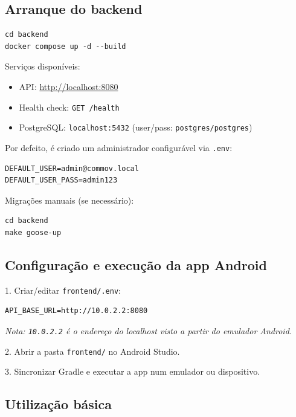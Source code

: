 \documentclass[12pt,a4paper]{article}
\begin{document}
\subsection{Arranque do backend}

\begin{lstlisting}
cd backend
docker compose up -d --build
\end{lstlisting}

Serviços disponíveis:

\begin{itemize}[leftmargin=*]
    \item API: \url{http://localhost:8080}
    \item Health check: \texttt{GET /health}
    \item PostgreSQL: \texttt{localhost:5432} (user/pass: \texttt{postgres/postgres})
\end{itemize}

Por defeito, é criado um administrador configurável via \texttt{.env}:

\begin{lstlisting}
DEFAULT_USER=admin@commov.local
DEFAULT_USER_PASS=admin123
\end{lstlisting}

Migrações manuais (se necessário):

\begin{lstlisting}
cd backend
make goose-up
\end{lstlisting}

\subsection{Configuração e execução da app Android}

1. Criar/editar \texttt{frontend/.env}:

\begin{lstlisting}
API_BASE_URL=http://10.0.2.2:8080
\end{lstlisting}

\textit{Nota: \texttt{10.0.2.2} é o endereço do localhost visto a partir do emulador Android.}

2. Abrir a pasta \texttt{frontend/} no Android Studio.

3. Sincronizar Gradle e executar a app num emulador ou dispositivo.

\subsection{Utilização básica}
\end{document}
